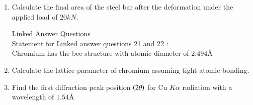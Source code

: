 \documentclass[journal]{IEEEtran}
\begin{document}
\begin{enumerate}[start=10]
\item %
Calculate the final area of the steel bar after the deformation under the applied load of $20kN$.
\begin{enumerate}
\end{enumerate}

Linked Answer Questions \\
Statement for  Linked answer questions 21 and 22 :\\
Chromium has the bcc structure with atomic diameter of $2.494 \text{\AA}$

\item %
Calculate the lattice parameter of chromium assuming tight atomic bonding. 
\begin{enumerate}
\end{enumerate}

\item %
Find the first diffraction peak position $\left(2 \theta\right)$ for Cu $K\alpha$ radiation with a wavelength of $1.54 \text{\AA}$
\begin{enumerate}
\end{enumerate}




\end{enumerate}
\end{document}
